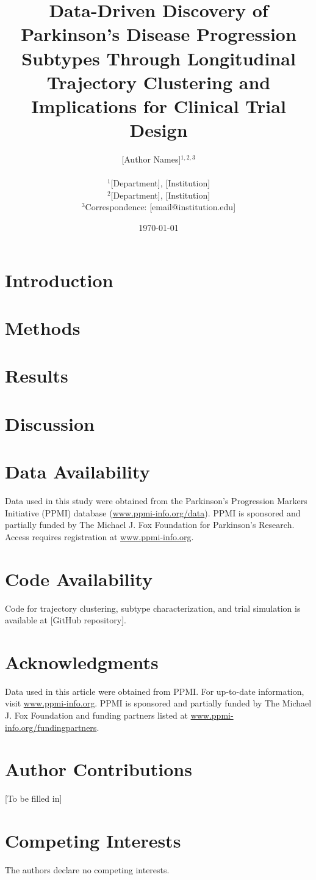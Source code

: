 \documentclass[9pt,twocolumn,twoside]{article}
\title{\textbf{Data-Driven Discovery of Parkinson's Disease Progression Subtypes Through Longitudinal Trajectory Clustering and Implications for Clinical Trial Design}}
\author{
[Author Names]$^{1,2,3}$ \\
\\
\small $^1$[Department], [Institution] \\
\small $^2$[Department], [Institution] \\
\small $^3$Correspondence: [email@institution.edu]
}
\date{\today}
\begin{document}
\maketitle



\section{Introduction}


\section{Methods}


\section{Results}


\section{Discussion}


\section{Data Availability}
Data used in this study were obtained from the Parkinson's Progression Markers Initiative (PPMI) database (\url{www.ppmi-info.org/data}). PPMI is sponsored and partially funded by The Michael J. Fox Foundation for Parkinson's Research. Access requires registration at \url{www.ppmi-info.org}.

\section{Code Availability}
Code for trajectory clustering, subtype characterization, and trial simulation is available at [GitHub repository].

\section{Acknowledgments}
Data used in this article were obtained from PPMI. For up-to-date information, visit \url{www.ppmi-info.org}. PPMI is sponsored and partially funded by The Michael J. Fox Foundation and funding partners listed at \url{www.ppmi-info.org/fundingpartners}.

\section{Author Contributions}
[To be filled in]

\section{Competing Interests}
The authors declare no competing interests.



\end{document}
